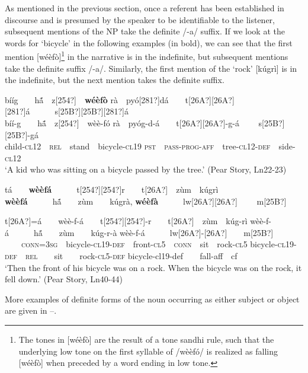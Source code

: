 \documentclass[output=paper]{langsci/langscibook}
\begin{document}
As mentioned in the previous section, once a referent has been established in discourse and is presumed by the speaker to be identifiable to the listener, subsequent mentions of the NP take the definite /-a/ suffix. If we look at the words for ‘bicycle’ in the following examples (in bold), we can see that the first mention [w\'{e}èf\`{o}]\footnote{The tones in [w\'{e}\`{e}f\`{o}] are the result of a tone sandhi rule, such that the underlying low tone on the first syllable of /w\`{e}\`{e}f\'{o}/ is realized as falling [w\'{e}\`{e}f\`{o}] when preceded by a word ending in low tone.} in the narrative is in the indefinite, but subsequent mentions take the definite suffix /-a/. Similarly, the first mention of the ‘rock’ [k\'{u}gr\`{i}] is in the indefinite, but the next mention takes the definite suffix.

\ea\label{ex:teo:40}
b\'{i}\'{i}g\ \ \ \ h\'{ã}\ \ z[254?]\ \ \textbf{wéèfò} r\`{a}\ \ py\'{o}[281?]d\'{a}\ \ \ \ t[26A?][26A?][281?]á\ \ \ \ \ \ s[25B?][25B?][281?]\'{a}\\
\gll bíí-g\ \ \ \ h\'{ã}\ \ z[254?]\ \ w\`{e}è-f\'{o} r\`{a}\ \ py\'{o}g-d-\'{a}\ \ \ \ t[26A?][26A?]-g-á \ \ \ \ s[25B?][25B?]-g\'{a}\\
child-\textsc{cl}12\ \ \textsc{rel}\ \ stand\ \ bicycle-\textsc{cl}19 \textsc{pst\ \ pass-prog-aff\ \ }tree-\textsc{cl12-def\ \ }side-\textsc{cl12}\\
\glt ‘A kid who was sitting on a bicycle passed by the tree.’ (Pear Story, Ln22-23)
\z

\ea\label{ex:teo:41}
tá\ \ \ \ \textbf{wèèfá}\ \ \ \ \ \ t[254?][254?]r\ \ \ \ t[26A?]\ \ zùm\ \ kúgrì \textbf{wèèfá}\ \ \ \ \ \ h\'{ã}\ \ \ \ zùm\ \ \ \ kúgrà, \textbf{wéèfà}\ \ \ \ \ \ lw[26A?][26A?] \ \ \ \ m[25B?]

\gll t[26A?]=á\ \ \ \ wèè-f-á\ \ \ \ t[254?][254?]-r\ \ \ \ t[26A?]\ \ zùm\ \ kúg-rì wèè-f-á\ \ \ \ \ \ h\'{ã}\ \ \ \ zùm\ \ \ \ kúg-r-à w\`{e}è-f-\'{a}\ \ \ \ \ \ lw[26A?]-[26A?]\ \ \ \ m[25B?]\\
\textsc{\ \ \ \ conn}=3\textsc{sg}\ \ bicycle-\textsc{cl19}{}-\textsc{def}\ \ front-\textsc{cl}5\ \ \textsc{conn}\ \ sit\ \ rock-\textsc{cl}5 bicycle-\textsc{cl19}{}-\textsc{def\ \ rel\ \ \ \ }sit\ \ \ \ rock-\textsc{cl}5-\textsc{def} bicycle-cl19-def\ \ \ \ fall-aff\ \ cf\\
\glt ‘Then the front of his bicycle was on a rock. When the bicycle was on the rock, it fell down.’ (Pear Story, Ln40-44)
\z

More examples of definite forms of the noun occurring as either subject or object are given in –.
\end{document}
